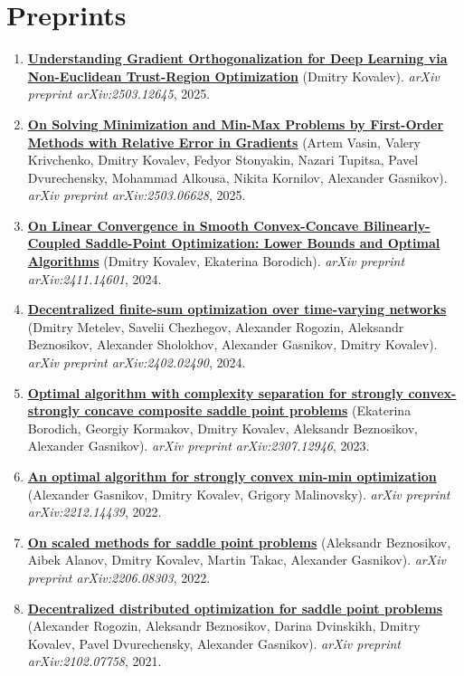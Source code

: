 \section{Preprints}
\begin{enumerate}
\item
\textbf{\href{https://arxiv.org/abs/2503.12645}{Understanding Gradient Orthogonalization for Deep Learning via Non-Euclidean Trust-Region Optimization}} (Dmitry Kovalev). \textit{arXiv preprint arXiv:2503.12645}, 2025.
\item
\textbf{\href{https://arxiv.org/abs/2503.06628}{On Solving Minimization and Min-Max Problems by First-Order Methods with Relative Error in Gradients}} (Artem Vasin, Valery Krivchenko, Dmitry Kovalev, Fedyor Stonyakin, Nazari Tupitsa, Pavel Dvurechensky, Mohammad Alkousa, Nikita Kornilov, Alexander Gasnikov). \textit{arXiv preprint arXiv:2503.06628}, 2025.
\item
\textbf{\href{https://arxiv.org/abs/2411.14601}{On Linear Convergence in Smooth Convex-Concave Bilinearly-Coupled Saddle-Point Optimization: Lower Bounds and Optimal Algorithms}} (Dmitry Kovalev, Ekaterina Borodich). \textit{arXiv preprint arXiv:2411.14601}, 2024.
\item
\textbf{\href{https://arxiv.org/abs/2402.02490}{Decentralized finite-sum optimization over time-varying networks}} (Dmitry Metelev, Savelii Chezhegov, Alexander Rogozin, Aleksandr Beznosikov, Alexander Sholokhov, Alexander Gasnikov, Dmitry Kovalev). \textit{arXiv preprint arXiv:2402.02490}, 2024.
\item
\textbf{\href{https://arxiv.org/abs/2307.12946}{Optimal algorithm with complexity separation for strongly convex-strongly concave composite saddle point problems}} (Ekaterina Borodich, Georgiy Kormakov, Dmitry Kovalev, Aleksandr Beznosikov, Alexander Gasnikov). \textit{arXiv preprint arXiv:2307.12946}, 2023.
\item
\textbf{\href{https://arxiv.org/abs/2212.14439}{An optimal algorithm for strongly convex min-min optimization}} (Alexander Gasnikov, Dmitry Kovalev, Grigory Malinovsky). \textit{arXiv preprint arXiv:2212.14439}, 2022.
\item
\textbf{\href{https://arxiv.org/abs/2206.08303}{On scaled methods for saddle point problems}} (Aleksandr Beznosikov, Aibek Alanov, Dmitry Kovalev, Martin Takac, Alexander Gasnikov). \textit{arXiv preprint arXiv:2206.08303}, 2022.
\item
\textbf{\href{https://arxiv.org/abs/2102.07758}{Decentralized distributed optimization for saddle point problems}} (Alexander Rogozin, Aleksandr Beznosikov, Darina Dvinskikh, Dmitry Kovalev, Pavel Dvurechensky, Alexander Gasnikov). \textit{arXiv preprint arXiv:2102.07758}, 2021.

\end{enumerate}
